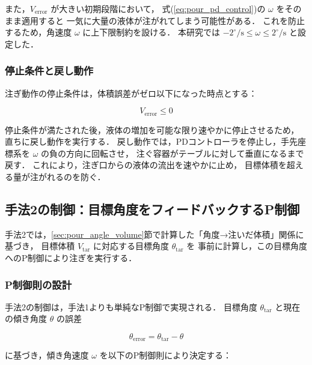 また，$V_{\mathrm{error}}$ が大きい初期段階において，
式(\ref{eq:pour_pd_control})の $\omega$ をそのまま適用すると
一気に大量の液体が注がれてしまう可能性がある．
これを防止するため，角速度 $\omega$ に上下限制約を設ける．
本研究では $-2^\circ/\mathrm{s} \leq \omega \leq 2^\circ/\mathrm{s}$ と設定した．

\subsubsection{停止条件と戻し動作}

注ぎ動作の停止条件は，体積誤差がゼロ以下になった時点とする：

\begin{equation}
  V_{\mathrm{error}} \leq 0
  \label{eq:pour_stop_condition}
\end{equation}

停止条件が満たされた後，液体の増加を可能な限り速やかに停止させるため，
直ちに戻し動作を実行する．
戻し動作では，PDコントローラを停止し，手先座標系を $\omega$ の負の方向に回転させ，
注ぐ容器がテーブルに対して垂直になるまで戻す．
これにより，注ぎ口からの液体の流出を速やかに止め，
目標体積を超える量が注がれるのを防ぐ．

\subsection{手法2の制御：目標角度をフィードバックするP制御}
\label{sec:pour_method2_p_control}

手法2では，\ref{sec:pour_angle_volume}節で計算した「角度→注いだ体積」関係に基づき，
目標体積 $V_{\mathrm{tar}}$ に対応する目標角度 $\theta_{\mathrm{tar}}$ を
事前に計算し，この目標角度へのP制御により注ぎを実行する．

\subsubsection{P制御則の設計}

手法2の制御は，手法1よりも単純なP制御で実現される．
目標角度 $\theta_{\mathrm{tar}}$ と現在の傾き角度 $\theta$ の誤差

\begin{equation}
  \theta_{\mathrm{error}} = \theta_{\mathrm{tar}} - \theta
  \label{eq:pour_theta_error}
\end{equation}

に基づき，傾き角速度 $\omega$ を以下のP制御則により決定する：

